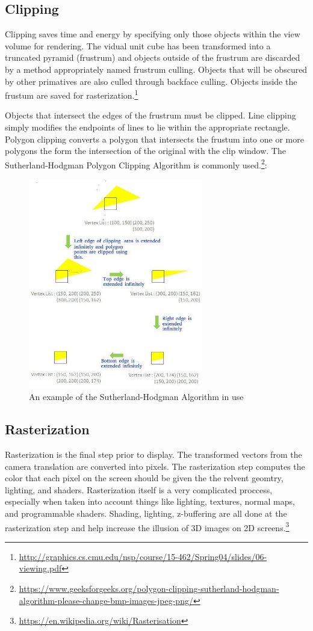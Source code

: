 \documentclass{article}
\begin{document}
\subsection{Clipping}
Clipping saves time and energy by specifying only those objects within the view volume for rendering. The vidual unit cube has been transformed into a truncated pyramid (frustrum) and objects outside of the frustrum are discarded by a method appropriately named frustrum culling. Objects that will be obscured by other primatives are also culled through backface culling. Objects inside the frustum are saved for rasterization.\footnote{\url{http://graphics.cs.cmu.edu/nsp/course/15-462/Spring04/slides/06-viewing.pdf}}

Objects that intersect the edges of the frustrum must be clipped. Line clipping simply modifies the endpoints of lines to lie within the appropriate rectangle. Polygon clipping converts a polygon that intersects the frustum into one or more polygons the form the intersection of the original with the clip window. The Sutherland-Hodgman Polygon Clipping Algorithm is commonly used.\footnote{\url{https://www.geeksforgeeks.org/polygon-clipping-sutherland-hodgman-algorithm-please-change-bmp-images-jpeg-png/}}:

\begin{figure}[H]
    \centering
    \includegraphics[width=3.0in]{Sutherland-Hodgman-Example.jpg}
    \caption{An example of the Sutherland-Hodgman Algorithm in use}
    \label{Sutherland-Hodgman}
\end{figure}

\subsection{Rasterization}
Rasterization is the final step prior to display. The transformed vectors from the camera translation are converted into pixels. The rasterization step computes the color that each pixel on the screen should be given the the relvent geomtry, lighting, and shaders. Rasterization itself is a very complicated proccess, especially when taken into account things like lighting, textures, normal maps, and programmable shaders. Shading, lighting, z-buffering are all done at the rasterization step and help increase the illusion of 3D images on 2D screens.\footnote{\url{https://en.wikipedia.org/wiki/Rasterisation}}
\end{document}
